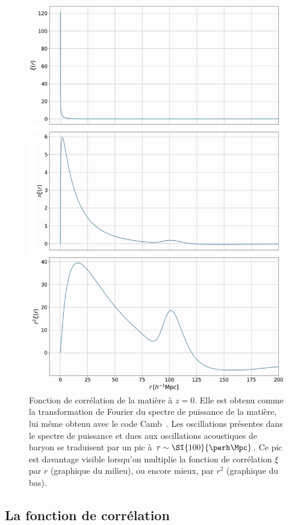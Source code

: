 \begin{figure}
  \centering
  \includegraphics[scale=0.45, angle=270]{xi_camb}
  \caption{Fonction de corrélation de la matière à $z = 0$. Elle est obtenu comme la transformation de Fourier du spectre de puissance de la matière, lui même obtenu avec le code Camb~\autocite{Lewis1999}. Les oscillations présentes dans le spectre de puissance et dues aux oscillations acoustiques de baryon se traduisent par un pic à $r \sim \SI{100}{\perh\Mpc}$. Ce pic est davantage visible lorsqu'on multiplie la fonction de corrélation $\xi$ par $r$ (graphique du milieu), ou encore mieux, par $r^2$ (graphique du bas).}
  \label{fig:xi_camb}
\end{figure}

\subsection{La fonction de corrélation}

